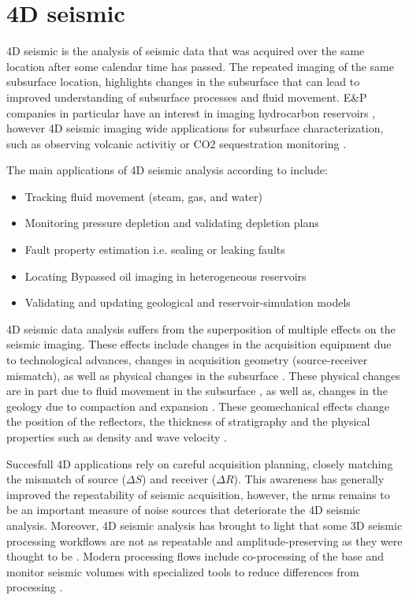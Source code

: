 \section{4D seismic}

4D seismic is the analysis of seismic data that was acquired over the same location after some calendar time has passed. The repeated imaging of the same subsurface location, highlights changes in the subsurface that can lead to improved understanding of subsurface processes and fluid movement. E\&P companies in particular have an interest in imaging hydrocarbon reservoirs \citep{Johnston2013-jg}, however 4D seismic imaging wide applications for subsurface characterization, such as observing volcanic activitiy \citep{londono20184d} or CO2 sequestration monitoring \citep{Arts2004-ym}. 

The main applications of 4D seismic analysis according to \citet{Yilmaz2003-hp,Johnston2013-qg} include:
\begin{itemize}
\item Tracking fluid movement (steam, gas, and water)
\item Monitoring pressure depletion and validating depletion plans
\item Fault property estimation i.e. sealing or leaking faults
\item Locating Bypassed oil imaging in heterogeneous reservoirs
\item Validating and updating geological and reservoir-simulation models
\end{itemize}

4D seismic data analysis suffers from the superposition of multiple effects on the seismic imaging. These effects include changes in the acquisition equipment due to technological advances, changes in acquisition geometry (source-receiver mismatch), as well as physical changes in the subsurface \citet{Yilmaz2003-hp, Johnston2013-jg}. These physical changes are in part due to fluid movement in the subsurface \citep{lumley1995seismic}, as well as, changes in the geology due to compaction and expansion \citep{Hatchell2005-op}. These geomechanical effects change the position of the reflectors, the thickness of stratigraphy and the physical properties such as density and wave velocity \citep{Herwanger2015-qz}.

Succesfull 4D applications rely on careful acquisition planning, closely matching the mismatch of source ($\Delta S$) and receiver ($\Delta R$). This awareness has generally improved the repeatability of seismic acquisition, however, the \ac{nrms} remains to be an important measure of noise sources that deteriorate the 4D seismic analysis. Moreover, 4D seismic analysis has brought to light that some 3D seismic processing workflows are not as repeatable and amplitude-preserving as they were thought to be \citep{Lumley2001-kx}. Modern processing flows include co-processing of the base and monitor seismic volumes with specialized tools to reduce differences from processing \citep{Johnston2013-qg}.

